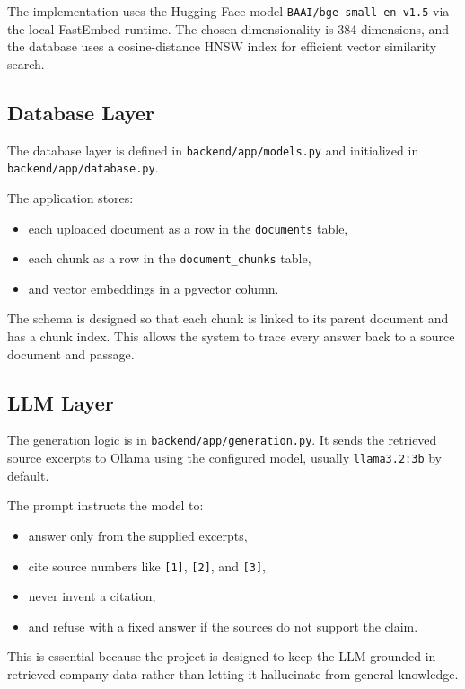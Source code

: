 \documentclass[11pt,a4paper]{article}
\begin{document}
The implementation uses the Hugging Face model \texttt{BAAI/bge-small-en-v1.5} via the local FastEmbed runtime. The chosen dimensionality is 384 dimensions, and the database uses a cosine-distance HNSW index for efficient vector similarity search.

\subsection{Database Layer}
The database layer is defined in \texttt{backend/app/models.py} and initialized in \texttt{backend/app/database.py}.

The application stores:

\begin{itemize}[leftmargin=1.5em]
    \item each uploaded document as a row in the \texttt{documents} table,
    \item each chunk as a row in the \texttt{document\_chunks} table,
    \item and vector embeddings in a pgvector column.
\end{itemize}

The schema is designed so that each chunk is linked to its parent document and has a chunk index. This allows the system to trace every answer back to a source document and passage.

\subsection{LLM Layer}
The generation logic is in \texttt{backend/app/generation.py}. It sends the retrieved source excerpts to Ollama using the configured model, usually \texttt{llama3.2:3b} by default.

The prompt instructs the model to:

\begin{itemize}[leftmargin=1.5em]
    \item answer only from the supplied excerpts,
    \item cite source numbers like \texttt{[1]}, \texttt{[2]}, and \texttt{[3]},
    \item never invent a citation,
    \item and refuse with a fixed answer if the sources do not support the claim.
\end{itemize}

This is essential because the project is designed to keep the LLM grounded in retrieved company data rather than letting it hallucinate from general knowledge.
\end{document}
